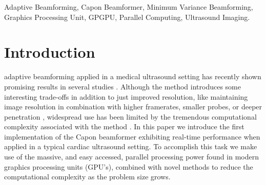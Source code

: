 \documentclass[journal]{IEEEtran}
\begin{document}
\begin{IEEEkeywords}
Adaptive Beamforming, Capon Beamformer, Minimum Variance Beamforming, Graphics Processing Unit, GPGPU, Parallel Computing, Ultrasound Imaging.
\end{IEEEkeywords}






%
\IEEEpeerreviewmaketitle



\section{Introduction}
% 
% 
% 
% 

 adaptive beamforming \cite{Capon1969} applied in a medical ultrasound setting has recently shown promising results in several studies \cite{Synnevag2007, Austeng2008, Vignon2008, Viola, Mehdizadeh2012}. Although the method introduces some interesting trade-offs in addition to just improved resolution, like maintaining image resolution in combination with higher framerates, smaller probes, or deeper penetration \cite{Synnevag2009}, widespread use has been limited by the tremendous computational complexity associated with the method \cite{So2011}.  In this paper we introduce the first implementation of the Capon beamformer exhibiting real-time performance when applied in a typical cardiac ultrasound setting. To accomplish this task we make use of the massive, and easy accessed, parallel processing power found in modern graphics processing units (GPU's), combined with novel methods to reduce the computational complexity as the problem size grows. 
\end{document}
